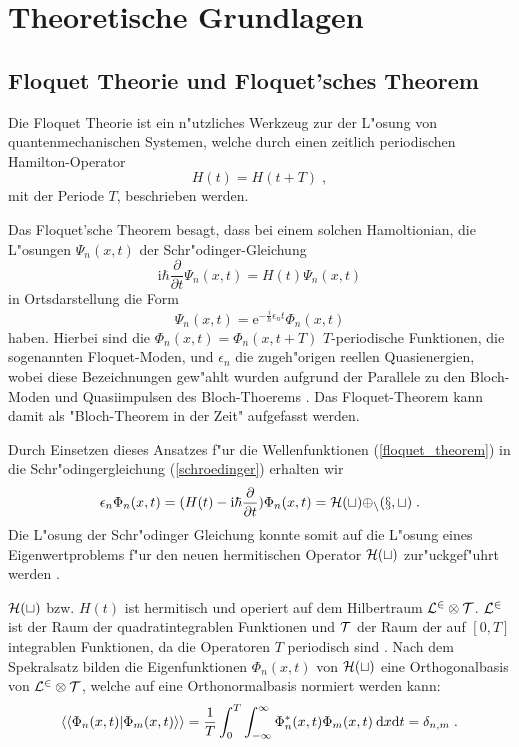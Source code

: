 \chapter{Theoretische Grundlagen}


\section{Floquet Theorie und Floquet'sches Theorem}
  Die Floquet Theorie ist ein n"utzliches Werkzeug zur der L"osung von quantenmechanischen Systemen, welche durch einen zeitlich periodischen Hamilton-Operator
  \begin{equation}
    H(t) = H(t+T) \; ,
  \end{equation}
  mit der Periode $T$, beschrieben werden.

  Das Floquet'sche Theorem besagt, dass bei einem solchen Hamoltionian, die L"osungen $\Psi_n(x,t)$ der Schr"odinger-Gleichung
  \begin{equation}
    \text{i}\hbar\frac{\partial}{\partial t}\Psi_n(x,t) = H(t)\Psi_n(x,t)
    \label{schroedinger}
  \end{equation}
  in Ortsdarstellung die Form
  \begin{equation}
    \Psi_n(x,t) = \text{e}^{-\frac{i}{\hbar}\epsilon_nt}\Phi_n(x,t)
    \label{floquet_theorem}
  \end{equation}
  haben.
  Hierbei sind die $\Phi_n(x,t) = \Phi_n(x,t+T)$ $T$-periodische Funktionen, die sogenannten Floquet-Moden, und $\epsilon_n$ die zugeh"origen reellen Quasienergien, wobei diese Bezeichnungen gew"ahlt wurden aufgrund der Parallele zu den Bloch-Moden und Quasiimpulsen des Bloch-Thoerems \cite{haenggi}.
  Das Floquet-Theorem kann damit als "Bloch-Theorem in der Zeit" aufgefasst werden.

  Durch Einsetzen dieses Ansatzes f"ur die Wellenfunktionen (\ref{floquet_theorem}) in die Schr"odingergleichung (\ref{schroedinger}) erhalten wir
  \begin{equation}
    \epsilon_n \Phi_n(x,t) = (H(t)-\text{i}\hbar\frac{\partial}{\partial t})\Phi_n(x,t) = \cal{H}(t) \Phi_n(x,t) \; .
    \label{eigenwertproblem}
  \end{equation}
  Die L"osung der Schr"odinger Gleichung konnte somit auf die L"osung eines Eigenwertproblems f"ur den neuen hermitischen Operator $\cal{H}(t)$ zur"uckgef"uhrt werden \cite{sherly}.

  $\cal{H}(t)$ bzw. $H(t)$ ist hermitisch und operiert auf dem Hilbertraum $\cal{L}^2 \otimes \cal{T}$.
  $\cal{L}^2$ ist der Raum der quadratintegrablen Funktionen und $\cal{T}$ der Raum der auf $[0,T]$ integrablen Funktionen, da die Operatoren $T$ periodisch sind \cite{haenggi}.
  Nach dem Spekralsatz bilden die Eigenfunktionen $\Phi_n(x,t)$ von $\cal{H}(t)$ eine Orthogonalbasis von $\cal{L}^2 \otimes \cal{T}$, welche auf eine Orthonormalbasis normiert werden kann:
  \begin{equation}
    \braket{\braket{\Phi_n(x,t)|\Phi_m(x,t)}} = \frac{1}{T} \int_0^T \int_{-\infty}^{\infty} \Phi_n^*(x,t)\Phi_m(x,t) \: \text{d}x\text{d}t = \delta_{n,m} \; .
  \end{equation}



